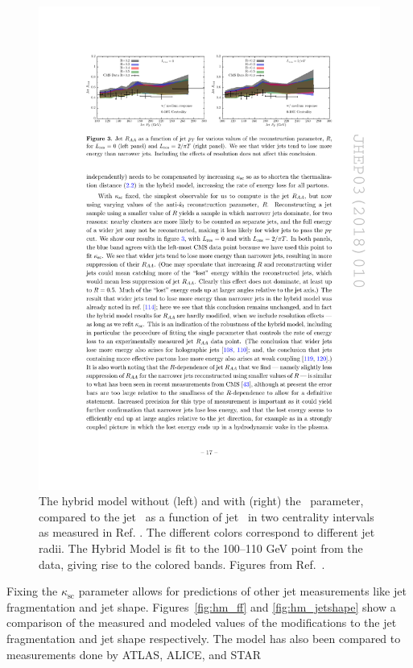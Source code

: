\begin{figure}[htbp]
\begin{center}
\includegraphics[width=1\textwidth]{figures/jetMeasurements/HM_raa}
\caption{The hybrid model without (left) and with (right) the \Lres\ parameter, compared to the jet \RAA\ as a function of jet \pt\ in two centrality intervals as measured in Ref.
\cite{Khachatryan:2016jfl}.
The different colors correspond to different jet radii.
The Hybrid Model is fit to the 100--110 GeV point from the data, giving rise to the colored bands.
Figures from Ref.~\cite{Hulcher:2017cpt}.
}
\label{fig:hm_fitting}
\end{center}
\end{figure}

Fixing the $\kappa_\mathrm{sc}$ parameter allows for predictions of other jet measurements like jet fragmentation and jet shape.
Figures~\ref{fig:hm_ff} and \ref{fig:hm_jetshape} show a comparison of the measured and modeled values of the modifications to the jet fragmentation and jet shape respectively.
 The model has also been compared to measurements done by ATLAS, ALICE, and STAR \cite{2013220, Abelev:2013kqa, RUSNAK:2014xfa}


